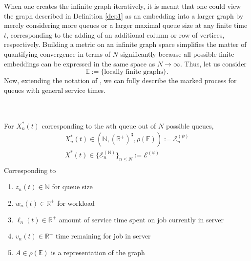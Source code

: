 When one creates the infinite graph iteratively, it is meant that one could view the graph described in Definition \ref{dep1} as an embedding into a larger graph by merely considering more queues or a larger maximal queue size at any finite time $t$, corresponding to the adding of an additional column or row of vertices, respectively. Building a metric on an infinite graph space simplifies the matter of quantifying convergence in terms of $N$ significantly because all possible finite embeddings can be expressed in the same space as $N\rightarrow \infty$. Thus, let us consider \[\mathbb{E}:= \{\text{locally finite graphs}\}.\] Now, extending the notation of \cite{bramson_asymptotic_2012}, we can fully describe the marked process for queues with general service times.
\begin{definition}
    \hfill \\
    \hfill \\
    For $X^{*}_{n}(t)$ corresponding to the $n$th queue out of $N$ possible queues,
    \begin{gather*}
        X_{n}^{*}(t)\in (\mathbb{N},(\mathbb{R}^{+})^{3},\rho(\mathbb{E})):=\mathcal{E}^{(\psi)}_{n}\\
        X^{*}(t) \in \{\mathcal{E}^{(\mathbb{N})}_{n}\}_{n \leq N} := \mathcal{E}^{(\psi)}\\
    \end{gather*}
    Corresponding to
    \begin{enumerate}
        \item $z_{n}(t) \in \mathbb{N}$ for queue size
        \item $ w_{n}(t) \in \mathbb{R}^{+}$ for workload
        \item $\ell_{n}(t) \in \mathbb{R}^{+}$ amount of service time spent on job currently in server
        \item $v_{n}(t) \in \mathbb{R}^{+}$ time remaining for job in server
        \item $A \in \rho(\mathbb{E})$ is a representation of the graph
    \end{enumerate}
    \label{def:spec}
\end{definition}


